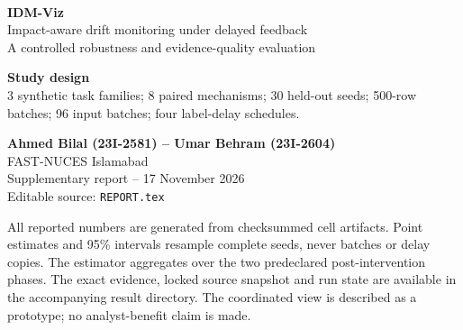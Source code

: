 \documentclass[11pt,a4paper]{article}
\begin{document}
\begin{titlepage}\color{ink}
\vspace*{12mm}{\large\textcolor{teal}{DATA ANALYSIS AND VISUALIZATION -- PHASE 3}}\\[18mm]
{\Huge\bfseries IDM-Viz}\\[4mm]
{\LARGE Impact-aware drift monitoring under delayed feedback}\\[8mm]
{\Large A controlled robustness and evidence-quality evaluation}\\[20mm]
\begin{tcolorbox}[colback=mist,colframe=teal,boxrule=0pt,leftrule=2.2mm,arc=1.5mm]
\textbf{Study design}\\
3 synthetic task families; 8 paired mechanisms; 30 held-out seeds; 500-row batches; 96 input batches; four label-delay schedules.
\end{tcolorbox}
\vfill
\textbf{Ahmed Bilal (23I-2581) -- Umar Behram (23I-2604)}\\
FAST-NUCES Islamabad\\[4mm]
Supplementary report -- 17 November 2026\\
Editable source: \texttt{REPORT.tex}
\end{titlepage}
\tableofcontents\clearpage
\begin{abstract}
This supplementary evaluation strengthens the Phase 3 implementation with paired, controlled drift mechanisms and an explicit input-before-label release runner. It compares a frozen isotonic Average-Confidence estimator with raw confidence, an ATC-style estimator and historical accuracy; measures original-feature/PCA and pairwise-correlation input evidence; and verifies cached predictions after delays of 0, 5, 20 and 100 batches. The locked held-out matrix contains \textbf{720 complete task--mechanism--seed cells}; the primary comparison uses eight features and \textbf{30 independent seed blocks}. Results are conditional on the stated synthetic laws. They do not establish general transfer, causal attribution, certified harm probability, future-risk performance, or improved analyst decisions.
\end{abstract}

\begin{tcolorbox}[breakable,colback=mist,colframe=ink,boxrule=.4pt,title=Interpretation at a glance]
All reported numbers are generated from checksummed cell artifacts. Point estimates and 95\% intervals resample complete seeds, never batches or delay copies. The estimator aggregates over the two predeclared post-intervention phases. The exact evidence, locked source snapshot and run state are available in the accompanying result directory. The coordinated view is described as a prototype; no analyst-benefit claim is made.
\end{tcolorbox}
\end{document}
